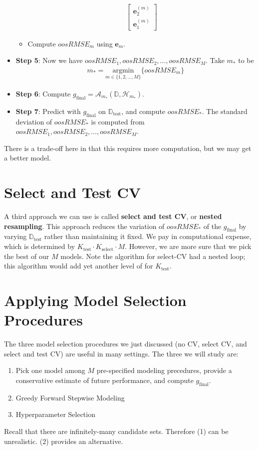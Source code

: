 \documentclass[12pt, a4paper]{article}
\theoremstyle{definition}
\newcommand{\test}{\text{test}}
\newcommand{\select}{\text{select}}
\newcommand{\Dtest}{\mathbb{D}_{\test}}
\begin{document}
\begin{itemize}
\begin{itemize}
\begin{align*}
\begin{bmatrix}
						\bm{e}_{2}^{(m)}\\
						\bm{e}_{1}^{(m)}
					\end{bmatrix}
			\end{align*}
			\item Compute $oosRMSE_m$ using $\bm{e}_m$.
		\end{itemize}
		\item \textbf{Step 5}: Now we have $oosRMSE_1,oosRMSE_2,\ldots,oosRMSE_M$. Take $m_*$ to be
		\begin{align*}
			m_* = \underset{m\in\{1,2,\ldots,M\}}{\text{argmin}}
			\{
			oosRMSE_m
			\}
		\end{align*}
		\item \textbf{Step 6}: Compute $g_{\text{final}} = \mathcal{A}_{m_*} (\mathbb{D}, \mathcal{H}_{m_*})$.
		\item \textbf{Step 7}: Predict with $g_{\text{final}}$ on $\Dtest$, and
		compute $oosRMSE_{*}$. The standard deviation of $oosRMSE_{\text{*}}$
		is computed from $oosRMSE_1,oosRMSE_2,\ldots,oosRMSE_M$.
	\end{itemize}
	There is a trade-off here in that this requires more computation, but we may get
	a better model.
	\section*{Select and Test CV}
	A third approach we can use is called \textbf{select and test CV}, or
	\textbf{nested resampling}. This approach reduces the variation of $oosRMSE_*$
	of the $g_{\text{final}}$ by varying $\Dtest$ rather than maintaining it fixed.
	We pay in computational expense, which is determined by $K_\test\cdot K_\select\cdot M$.
	However, we are more sure that we pick the best of our $M$ models.
	Note the algorithm for select-CV had a nested loop; this algorithm would
	add yet another level of for $K_\test$.
	\section*{Applying Model Selection Procedures}
	The three model selection procedures we just discussed (no CV, select CV, and
	select and test CV) are useful in many settings. The three we will study are:
	\begin{enumerate}[label=(\arabic*)]
		\item Pick one model among $M$ pre-specified modeling precedures, provide
		a conservative estimate of future performance, and compute $g_{\text{final}}$.
		\item Greedy Forward Stepwise Modeling
		\item Hyperparameter Selection
	\end{enumerate}
	Recall that there are infinitely-many candidate sets. Therefore (1) can be unrealistic.
	(2) provides an alternative.
\end{document}

